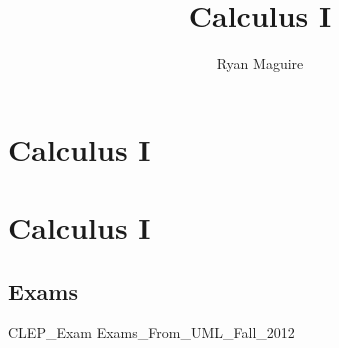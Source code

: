 \documentclass[crop=false,class=book,oneside]{standalone}
\begin{document}
    \newif\ifmathcoursescalculusI
    \ifx\ifmathcourses\undefined
        \title{Calculus I}
        \author{Ryan Maguire}
        \date{\vspace{-5ex}}
        \maketitle
        \tableofcontents
        \chapter*{Calculus I}
        \setcounter{chapter}{1}
    \else
        \chapter{Calculus I}
    \fi
    \section{Exams}
        {CLEP_Exam}
        {Exams_From_UML_Fall_2012}
\end{document}
